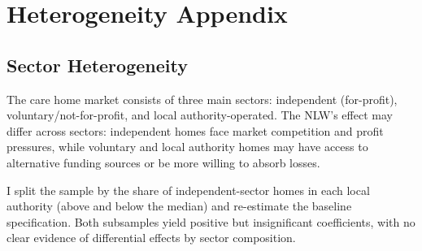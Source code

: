 \documentclass[12pt]{article}
\begin{document}
\section{Heterogeneity Appendix}
\label{app:heterogeneity}

\subsection{Sector Heterogeneity}

The care home market consists of three main sectors: independent (for-profit), voluntary/not-for-profit, and local authority-operated. The NLW's effect may differ across sectors: independent homes face market competition and profit pressures, while voluntary and local authority homes may have access to alternative funding sources or be more willing to absorb losses.

I split the sample by the share of independent-sector homes in each local authority (above and below the median) and re-estimate the baseline specification. Both subsamples yield positive but insignificant coefficients, with no clear evidence of differential effects by sector composition.
\end{document}
